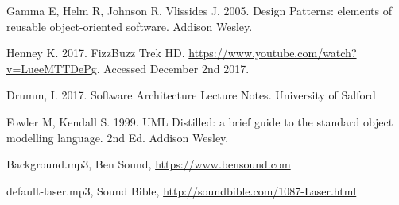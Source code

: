 \documentclass[a4paper,12pt]{article}
\begin{document}

\begin{thebibliography}{9}
	Gamma E, Helm R, Johnson R, Vlissides J. 2005. Design Patterns: elements of reusable object-oriented software. Addison Wesley.
	
	Henney K. 2017. FizzBuzz Trek HD. \url{https://www.youtube.com/watch?v=LueeMTTDePg}. Accessed December 2nd 2017.
	
	Drumm, I. 2017. Software Architecture Lecture Notes. University of Salford
	
	Fowler M, Kendall S. 1999. UML Distilled: a brief guide to the standard object modelling language. 2nd Ed. Addison Wesley.
	
	Background.mp3, Ben Sound, \url{https://www.bensound.com}
	
	default-laser.mp3, Sound Bible, \url{http://soundbible.com/1087-Laser.html}
\end{thebibliography}
\end{document}
